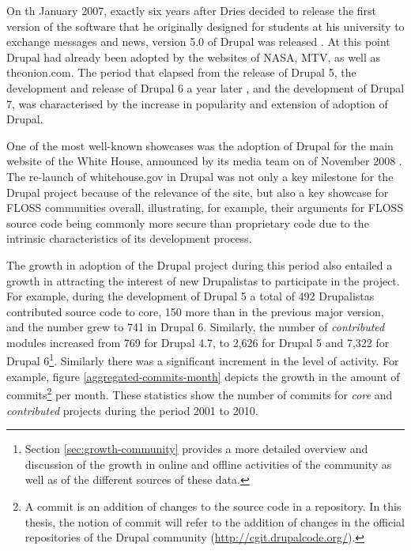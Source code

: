 On th January 2007, exactly six years after Dries decided to release the first version of the software that he originally designed for students at his university to exchange messages and news, version 5.0 of Drupal was released \parencite{drupal-5-release:Online}. At this point Drupal had already been adopted by the websites of NASA, MTV, as well as theonion.com. The period that elapsed from the release of Drupal 5, the development and release of Drupal 6 a year later \parencite{drupal-6-release:Online}, and the development of Drupal 7, was characterised by the increase in popularity and extension of adoption of Drupal. 

One of the most well-known showcases was the adoption of Drupal for the main website of the White House, announced by its media team on  of November 2008 \parencite{drupal-whitehouse-announcement:Online}. The re-launch of whitehouse.gov in Drupal was not only a key milestone for the Drupal project because of the relevance of the site, but also a key showcase for FLOSS communities overall, illustrating, for example, their arguments for FLOSS source code being commonly more secure than proprietary code due to the intrinsic characteristics of its development process.  

The growth in adoption of the Drupal project during this period also entailed a growth in attracting the interest of new Drupalistas to participate in the project. For example, during the development of Drupal 5 a total of 492 Drupalistas contributed source code to core, 150 more than in the previous major version, and the number grew to 741 in Drupal 6. Similarly, the number of \textit{contributed} modules increased from 769 for Drupal 4.7, to 2,626 for Drupal 5 and 7,322 for Drupal 6\footnote{Section \ref{sec:growth-community} provides a more detailed overview and discussion of the growth in online and offline activities of the community as well as of the different sources of these data.}. Similarly there was a significant increment in the level of activity. For example, figure \ref{aggregated-commits-month} depicts the growth in the amount of commits\footnote{A commit is an addition of changes to the source code in a repository. In this thesis, the notion of commit will refer to the addition of changes in the official repositories of the Drupal community (\url{http://cgit.drupalcode.org/}).} per month. These statistics show the number of commits for \textit{core} and \textit{contributed} projects during the period 2001 to 2010. 

